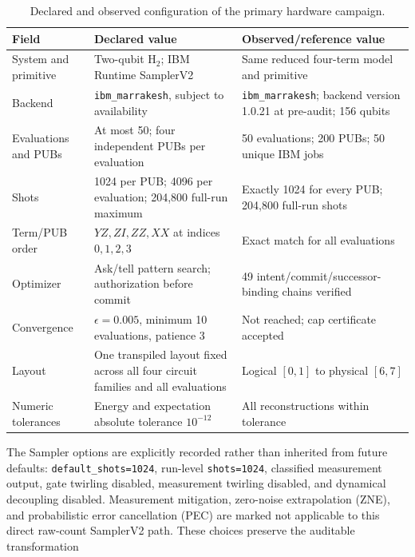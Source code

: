\begin{table}[t]
  \centering
  \caption{Declared and observed configuration of the primary hardware campaign.}
  \label{tab:rv-fixed-config}
  \renewcommand{\arraystretch}{1.1}
  \begin{tabular}{p{}p{}p{}}
    \toprule
    Field & Declared value & Observed/reference value \\
    \midrule
    System and primitive
      & Two-qubit $\mathrm{H}_2$; IBM Runtime SamplerV2
      & Same reduced four-term model and primitive \\
    Backend
      & \texttt{ibm\_marrakesh}, subject to availability
      & \texttt{ibm\_marrakesh}; backend version 1.0.21 at pre-audit; 156 qubits \\
    Evaluations and PUBs
      & At most 50; four independent PUBs per evaluation
      & 50 evaluations; 200 PUBs; 50 unique IBM jobs \\
    Shots
      & 1024 per PUB; 4096 per evaluation; 204,800 full-run maximum
      & Exactly 1024 for every PUB; 204,800 full-run shots \\
    Term/PUB order
      & $YZ,ZI,ZZ,XX$ at indices $0,1,2,3$
      & Exact match for all evaluations \\
    Optimizer
      & Ask/tell pattern search; authorization before commit
      & 49 intent/commit/successor-binding chains verified \\
    Convergence
      & $\epsilon=0.005$, minimum 10 evaluations, patience 3
      & Not reached; cap certificate accepted \\
    Layout
      & One transpiled layout fixed across all four circuit families and all evaluations
      & Logical $[0,1]$ to physical $[6,7]$ \\
    Numeric tolerances
      & Energy and expectation absolute tolerance $10^{-12}$
      & All reconstructions within tolerance \\
    \bottomrule
  \end{tabular}
\end{table}

The Sampler options are explicitly recorded rather than inherited from future
defaults: \texttt{default\_shots=1024}, run-level \texttt{shots=1024},
classified measurement output, gate twirling disabled, measurement twirling
disabled, and dynamical decoupling disabled.  Measurement mitigation, zero-noise
extrapolation (ZNE), and probabilistic error cancellation (PEC) are marked not
applicable to this direct raw-count SamplerV2 path.  These choices preserve the
auditable transformation

